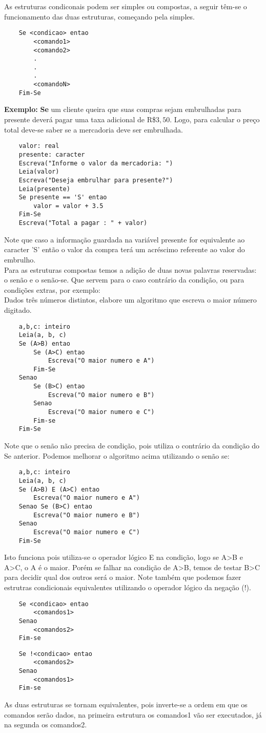 As estruturas condiconais podem ser simples ou compostas, a seguir têm-se o funcionamento das duas estruturas, começando pela simples.
\begin{lstlisting}
    Se <condicao> entao
        <comando1>
        <comando2>
        .
        .
        .
        <comandoN>
    Fim-Se
\end{lstlisting}
\textbf{Exemplo:} \textbf{Se} um cliente queira que suas compras sejam embrulhadas para presente deverá pagar uma taxa adicional de R\$$3,50$. Logo, para calcular o preço total deve-se saber se a mercadoria deve ser embrulhada.
\begin{lstlisting}
    valor: real
    presente: caracter
    Escreva("Informe o valor da mercadoria: ")
    Leia(valor)
    Escreva("Deseja embrulhar para presente?")
    Leia(presente)
    Se presente == 'S' entao
        valor = valor + 3.5
    Fim-Se
    Escreva("Total a pagar : " + valor)
\end{lstlisting}
Note que caso a informação guardada na variável presente for equivalente ao caracter 'S' então o valor da compra terá um acréscimo referente ao valor do embrulho. \\
Para as estruturas compostas temos a adição de duas novas palavras reservadas: o senão e o senão-se. Que servem para o caso contrário da condição, ou para condições extras, por exemplo: \\
Dados três números distintos, elabore um algoritmo que escreva o maior número digitado.
\begin{lstlisting}
    a,b,c: inteiro
    Leia(a, b, c)
    Se (A>B) entao
        Se (A>C) entao
            Escreva("O maior numero e A")
        Fim-Se
    Senao
        Se (B>C) entao
            Escreva("O maior numero e B")
        Senao
            Escreva("O maior numero e C")
        Fim-se
    Fim-Se
\end{lstlisting}
Note que o senão não precisa de condição, pois utiliza o contrário da condição do Se anterior. Podemos melhorar o algoritmo acima utilizando o senão se:
\begin{lstlisting}
    a,b,c: inteiro
    Leia(a, b, c)
    Se (A>B) E (A>C) entao
        Escreva("O maior numero e A")
    Senao Se (B>C) entao
        Escreva("O maior numero e B")
    Senao
        Escreva("O maior numero e C")
    Fim-Se
\end{lstlisting}
Isto funciona pois utiliza-se o operador lógico E na condição, logo se A>B e A>C, o A é o maior. Porém se falhar na condição de A>B, temos de testar B>C para decidir qual dos outros será o maior. Note também que podemos fazer estrutras condicionais equivalentes utilizando o operador lógico da negação (!).
\begin{lstlisting}
    Se <condicao> entao
        <comandos1>
    Senao
        <comandos2>
    Fim-se
\end{lstlisting}
\begin{lstlisting}
    Se !<condicao> entao
        <comandos2>
    Senao
        <comandos1>
    Fim-se
\end{lstlisting}
As duas estruturas se tornam equivalentes, pois inverte-se a ordem em que os comandos serão dados, na primeira estrutura os comandos1 vão ser executados, já na segunda os comandos2.